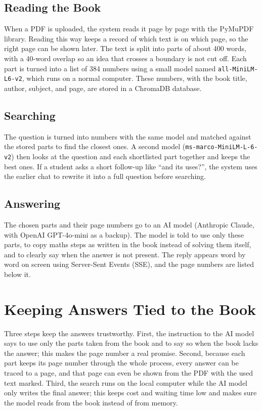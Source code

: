 \documentclass[journal]{IEEEtran}
\begin{document}
\subsection{Reading the Book}
When a PDF is uploaded, the system reads it page by page with the PyMuPDF
library. Reading this way keeps a record of which text is on which page,
so the right page can be shown later. The text is split into parts of
about 400 words, with a 40-word overlap so an idea that crosses a boundary
is not cut off. Each part is turned into a list of 384 numbers using a
small model named \texttt{all-MiniLM-L6-v2}, which runs on a normal
computer. These numbers, with the book title, author, subject, and page,
are stored in a ChromaDB database.

\subsection{Searching}
The question is turned into numbers with the same model and matched
against the stored parts to find the closest ones. A second model
(\texttt{ms-marco-MiniLM-L-6-v2}) then looks at the question and each
shortlisted part together and keeps the best ones. If a student asks a
short follow-up like ``and its uses?'', the system uses the earlier chat
to rewrite it into a full question before searching.

\subsection{Answering}
The chosen parts and their page numbers go to an AI model (Anthropic
Claude, with OpenAI GPT-4o-mini as a backup). The model is told to use
only these parts, to copy maths steps as written in the book instead of
solving them itself, and to clearly say when the answer is not present.
The reply appears word by word on screen using Server-Sent Events (SSE),
and the page numbers are listed below it.

\section{Keeping Answers Tied to the Book}
Three steps keep the answers trustworthy. First, the instruction to the
AI model says to use only the parts taken from the book and to say so
when the book lacks the answer; this makes the page number a real promise.
Second, because each part keeps its page number through the whole process,
every answer can be traced to a page, and that page can even be shown from
the PDF with the used text marked. Third, the search runs on the local
computer while the AI model only writes the final answer; this keeps cost
and waiting time low and makes sure the model reads from the book instead
of from memory.
\end{document}
